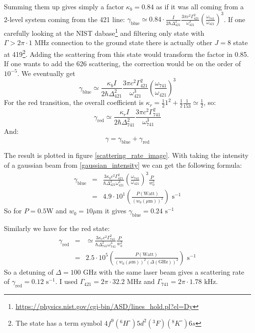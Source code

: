 \documentclass[reprint,amsmath,amssymb,aps,nofootinbib]{revtex4-1}
\begin{document}
Summing them up gives simply a factor $\kappa_{b} = 0.84$ as if it was all coming from a 2-level system coming from the 421 line: $\gamma_{\text{blue}} \simeq 0.84\cdot\frac{I}{2\hbar\Delta_{421}^{2}}\frac{3\pi c^{2}\Gamma_{421}^{2}}{\omega_{421}^{3}}\left(\frac{\omega_{741}}{\omega_{421}}\right)^{3}$. If one carefully looking at the NIST dabase\footnote{\url{https://physics.nist.gov/cgi-bin/ASD/lines_hold.pl?el=Dy}} and filtering only state with $\Gamma >2\pi\cdot 1\text{ MHz}$ connection to the ground state there is actually other $J = 8$ state at 419\footnote{The state has a term symbol $4f^{9}(^{6}H^{\circ})5d^{2}(^{3}F) (^{8}K^{\circ})6s$}. Adding the scattering from this state would transform the factor in 0.85. If one wants to add the 626 scattering, the correction would be on the order of $10^{-5}$.
We eventually get
\begin{equation}
\gamma_{\text{blue}} \simeq \frac{\kappa_{b} I}{2\hbar\Delta_{421}^{2}}\frac{3\pi c^{2}\Gamma_{421}^{2}}{\omega_{421}^{3}}\left(\frac{\omega_{741}}{\omega_{421}}\right)^{3}
\end{equation}
For the red transition, the overall coefficient is $\kappa_{r} = \frac{1}{2}1^{2}+\frac{1}{2}\frac{1}{153} \simeq \frac{1}{2}$, so:
\begin{equation}
\gamma_{\text{red}} \simeq \frac{\kappa_{r}I}{2\hbar\Delta_{741}^{2}}\frac{3\pi c^{2}\Gamma_{741}^{2}}{\omega_{741}^{3}}
\end{equation}
And:
\begin{equation}
\gamma = \gamma_{\text{blue}} + \gamma_{\text{red}} 
\end{equation}

The result is plotted in figure \ref{scattering_rate_image}. With taking the intensity of a gaussian beam from \ref{gaussian_intensity} we can get the following formula:
\begin{equation}
\begin{array}{llll}
\gamma_{\text{blue}} &=& \frac{3 \kappa_{b} c^{2}\Gamma_{421}^{2}}{\hbar\Delta_{421}^{2}\omega_{421}^{3}}\left(\frac{\omega_{741}}{\omega_{421}}\right)^{3}\frac{P}{w_{0}^{2}} \\[10pt]
	&=& 4.9\cdot 10^{1} \left( \frac{P(\text{Watt})}{(w_{0}(\mu\text{m}))^{2}}\right) \text{ s}^{-1}
\end{array}
\end{equation}
So for $P = 0.5\text{W}$ and $w_{0}=10\mu$m it gives $\gamma_{\text{blue}} = 0.24 \text{ s}^{-1}$

Similarly we have for the red state:
\begin{equation}
\begin{array}{llll}
\gamma_{\text{red}} &=& \simeq \frac{3\kappa_{r} c^{2}\Gamma_{741}^{2}}{\hbar\Delta_{741}^{2}\omega_{741}^{3}}\frac{P}{w_{0}^{2}} \\[10pt]
	&=& 2.5\cdot 10^{5} \left( \frac{P(\text{Watt})}{(w_{0}(\mu\text{m}))^{2}(\Delta(\text{GHz}))^{2}}\right) \text{ s}^{-1}
\end{array}
\end{equation}
So a detuning of $\Delta = 100\text{ GHz}$ with the same laser beam gives a scattering rate of $\gamma_{\text{red}} = 0.12 \text{ s}^{-1}$. I used $\Gamma_{421} = 2\pi\cdot 32.2\text{ MHz}$ and $\Gamma_{741} = 2\pi\cdot 1.78\text{ kHz}$.
\end{document}
